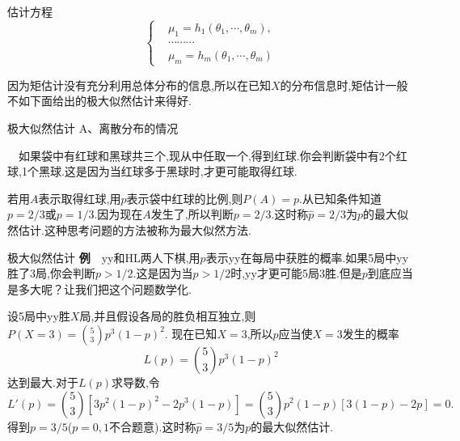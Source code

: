 	\begin{frame}
		\alert{估计方程}
		\begin{equation}  
			\left\{
			\begin{aligned}
			&\mu_1 = h_1(\theta_1,\cdots,\theta_m), \\
			&\cdots\cdots\cdots\\
			&\mu_m = h_m(\theta_1,\cdots,\theta_m)
			\end{aligned}
			\right.
		\end{equation}
		
		因为矩估计没有充分利用总体分布的信息,所以在已知$X$的分布信息时,矩估计一般不如下面给出的极大似然估计来得好.
	\end{frame}

	\begin{frame}{极大似然估计}
		A、离散分布的情况
		
		$\quad$如果袋中有红球和黑球共三个,现从中任取一个,得到红球.你会判断袋中有2个红球,1个黑球.这是因为当红球多于黑球时,才更可能取得红球.
		
		若用$A$表示取得红球,用$p$表示袋中红球的比例,则$P(A) = p$.从已知条件知道$p = 2/3$或$p = 1/3$.因为现在$A$发生了,所以判断$p=2/3$.这时称$\widehat{p} = 2/3$为$p$的最大似然估计.这种思考问题的方法被称为最大似然方法.
	\end{frame}

	\begin{frame}{极大似然估计}
		\textbf{例}$\quad$yy和HL两人下棋,用$p$表示yy在每局中获胜的概率.如果5局中yy胜了3局,你会判断$p>1/2$.这是因为当$p>1/2$时,yy才更可能5局3胜.但是$p$到底应当是多大呢？让我们把这个问题数学化.
		
		设5局中yy胜$X$局,并且假设各局的胜负相互独立,则
		$P(X=3) = \binom{5}{3}p^3(1-p)^2$.
		现在已知$X=3$,所以$p$应当使$X=3$发生的概率
		\begin{equation*}
			L(p) = \binom{5}{3}p^3(1-p)^2
		\end{equation*}
		达到最大.对于$L(p)$求导数,令
		\begin{equation*}
			L'(p) = \binom{5}{3}\left[3p^2(1-p)^2 - 2p^3(1-p)\right] = \binom{5}{3}p^2(1-p)[3(1-p)-2p]=0.
		\end{equation*}
		得到$p=3/5$($p=0,1$不合题意).这时称$\widehat{p}=3/5$为$p$的最大似然估计.
	\end{frame}


